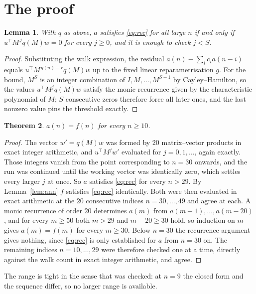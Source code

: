 \documentclass[11pt,a4paper]{article}
\theoremstyle{plain}
\newtheorem{theorem}{Theorem}
\newtheorem{lemma}[theorem]{Lemma}
\theoremstyle{definition}
\begin{document}
\section{The proof}

\begin{lemma}\label{lem:crit}
With $q$ as above, $a$ satisfies \eqref{eq:rec} for all large $n$ if and only if
$u^{\!\top}M^{\,j}q(M)w=0$ for every $j\ge0$, and it is enough to check $j<S$.
\end{lemma}

\begin{proof}
Substituting the walk expression, the residual $a(n)-\sum_ic_ia(n-i)$ equals
$u^{\!\top}M^{\,g(n)-r}q(M)w$ up to the fixed linear reparametrisation $g$. For the bound,
$M^{S}$ is an integer combination of $I,M,\dots,M^{S-1}$ by Cayley--Hamilton, so the values
$u^{\!\top}M^{j}q(M)w$ satisfy the monic recurrence given by the characteristic polynomial of
$M$; $S$ consecutive zeros therefore force all later ones, and the last nonzero value pins the
threshold exactly.
\end{proof}

\begin{theorem}
$a(n)=f(n)$ for every $n\ge10$.
\end{theorem}

\begin{proof}
The vector $w'=q(M)w$ was formed by $20$ matrix--vector products in exact integer
arithmetic, and $u^{\!\top}M^{j}w'$ evaluated for $j=0,1,\dots$, again exactly. Those integers
vanish from the point corresponding to $n=30$ onwards, and the run was continued until the
working vector was identically zero, which settles every larger $j$ at once. So $a$ satisfies
\eqref{eq:rec} for every $n>29$. By Lemma~\ref{lem:ann} $f$ satisfies \eqref{eq:rec}
identically. Both were then evaluated in exact arithmetic at the $20$ consecutive indices
$n=30,\dots,49$ and agree at each. A monic recurrence of order $20$
determines $a(m)$ from $a(m-1),\dots,a(m-20)$, and for every $m\ge50$ both
$m>29$ and $m-20\ge30$ hold, so induction on $m$ gives $a(m)=f(m)$ for every
$m\ge30$.
Below $n=30$ the recurrence argument gives nothing, since \eqref{eq:rec} is only
established for $a$ from $n=30$ on. The remaining indices $n=10,\dots,29$ were
therefore checked one at a time, directly against the walk count in exact integer arithmetic,
and agree.
\end{proof}

The range is tight in the sense that was checked: at $n=9$ the closed form and the sequence differ, so no larger range is available.
\end{document}
